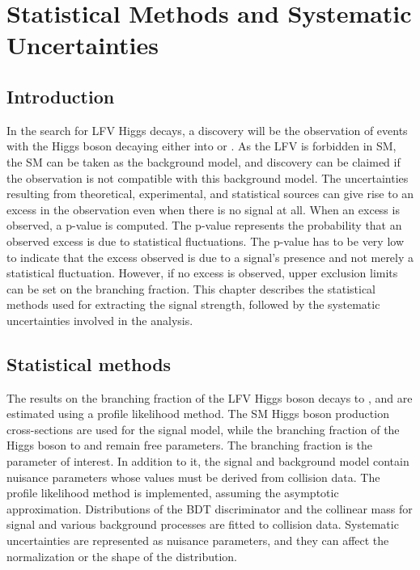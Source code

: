 %
%

\chapter{Statistical Methods and Systematic Uncertainties}
\label{syst_unc}

\section{Introduction}
In the search for LFV Higgs decays, a discovery will be the observation of events with the Higgs boson decaying either into \mutau or \etau. As the LFV is forbidden in SM, the SM can be taken as the background model, and discovery can be claimed if the observation is not compatible with this background model. The uncertainties resulting from theoretical, experimental, and statistical sources can give rise to an excess in the observation even when there is no signal at all. When an excess is observed, a p-value is computed. The p-value represents the probability that an observed excess is due to statistical fluctuations. The p-value has to be very low to indicate that the excess observed is due to a signal's presence and not merely a statistical fluctuation. However, if no excess is observed, upper exclusion limits can be set on the branching fraction. This chapter describes the statistical methods used for extracting the signal strength, followed by the systematic uncertainties involved in the analysis.

\section{Statistical methods}
\label{stat_meth}

The results on the branching fraction of the LFV Higgs boson decays to \mutau, and \etau are estimated using a profile likelihood method. The SM Higgs boson production cross-sections are used for the signal model, while the branching fraction of the Higgs boson to \mutau and \etau remain free parameters. The branching fraction is the parameter of interest. In addition to it, the signal and background model contain nuisance parameters whose values must be derived from collision data. The profile likelihood method is implemented, assuming the asymptotic approximation. Distributions of the BDT discriminator and the collinear mass for signal and various background processes are fitted to collision data. Systematic uncertainties are represented as nuisance parameters, and they can affect the normalization or the shape of the distribution.

